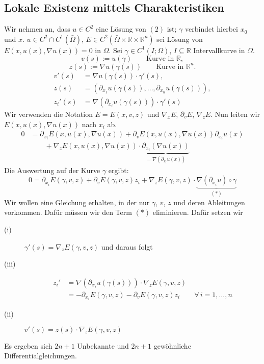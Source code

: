 \subsection{Lokale Existenz mittels Charakteristiken} 
\label{ssub:lokale_existenz_mittels_charakteristiken}
Wir nehmen an, dass $u \in C^2$ eine Lösung von $(2)$ ist; $\gamma$ verbindet hierbei $x_0$ und $x$. 
$u \in C^2 \cap C^1(\bar{\Omega})$, $E \in C^2(\bar{\Omega} \times \mathbb{R} \times \mathbb{R}^n)$ sei Lösung von $E(x,u(x), \nabla u(x)) = 0$ in $\Omega$. Sei $\gamma \in C^1(I;\Omega)$, $I \subseteq \mathbb{R}$ Intervallkurve in $\Omega$. \\
\[
	v(s) := u(\gamma) \qquad \text{Kurve in }\mathbb{R},
\] 
\[
	z(s) :=  \nabla u(\gamma(s)) \qquad \text{Kurve in }\mathbb{R}^n.
\]
\begin{align*}
	v'(s) &=  \nabla u(\gamma(s)) \cdot \gamma'(s), \\
	z(s) &= (\partial_{x_1}u(\gamma(s)), \dots, \partial_{x_n}u(\gamma(s))), \\
	z_i'(s) &=  \nabla (\partial_{x_i} u(\gamma(s))) \cdot \gamma'(s)
\end{align*}
Wir verwenden die Notation $E = E(x,v,z)$ und $ \nabla_x E$, $\partial_v E$, $ \nabla_z E$. Nun leiten wir \\$E(x,u(x), \nabla u(x))$ nach $x_i$ ab.
\begin{align*}
	0 &= \partial_{x_i} E(x, u(x),  \nabla u(x)) + \partial_{v} E(x,u(x), \nabla u(x))\partial_{x_i} u(x) \\
	&\qquad +  \nabla_z E(x,u(x), \nabla u(x)) \cdot \underset{=  \nabla (\partial_{x_i}u(x))}{\underbrace{\partial_{x_i}( \nabla u(x))}}
\end{align*}
Die Auswertung auf der Kurve $\gamma$ ergibt:
\[
	0 = \partial_{x_i} E(\gamma,v,z) + \partial_v E(\gamma,v,z)z_i +  \nabla_z E(\gamma, v,z) \cdot  \underset{(*)}{\underbrace{\nabla (\partial_{x_i}u) \circ \gamma}}
\]
Wir wollen eine Gleichung erhalten, in der nur $\gamma$, $v$, $z$ und deren Ableitungen vorkommen. Dafür müssen wir den Term $(*)$ eliminieren. Dafür setzen wir
\begin{description}
	\item[(i)]$\gamma'(s)=  \nabla _z E(\gamma,v,z)$ und daraus folgt
	\item[(iii)] \begin{align*}
		z_i' &=  \nabla (\partial_{x_i} u(\gamma(s)))\cdot  \nabla _z E(\gamma,v,z) \\
		&= - \partial_{x_i} E(\gamma,v,z) - \partial_v E(\gamma,v,z)z_i \qquad \forall\, i=1,\dots,n
	\end{align*} 
	\item[(ii)] $v'(s) = z(s) \cdot  \nabla_z E(\gamma,v,z)$
\end{description}
Es ergeben sich $2n+1$ Unbekannte und $2n+1$ gewöhnliche Differentialgleichungen.

